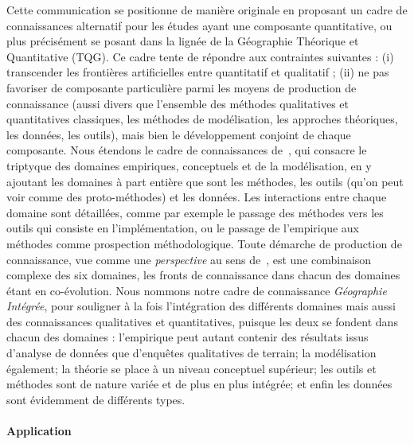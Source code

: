 \documentclass[11pt]{article}
\begin{document}
Cette communication se positionne de manière originale en proposant un cadre de connaissances alternatif pour les études ayant une composante quantitative, ou plus précisément se posant dans la lignée de la Géographie Théorique et Quantitative (TQG). Ce cadre tente de répondre aux contraintes suivantes : (i) transcender les frontières artificielles entre quantitatif et qualitatif ; (ii) ne pas favoriser de composante particulière parmi les moyens de production de connaissance (aussi divers que l'ensemble des méthodes qualitatives et quantitatives classiques, les méthodes de modélisation, les approches théoriques, les données, les outils), mais bien le développement conjoint de chaque composante. Nous étendons le cadre de connaissances de~\cite{livet2010ontology}, qui consacre le triptyque des domaines empiriques, conceptuels et de la modélisation, en y ajoutant les domaines à part entière que sont les méthodes, les outils (qu'on peut voir comme des proto-méthodes) et les données. Les interactions entre chaque domaine sont détaillées, comme par exemple le passage des méthodes vers les outils qui consiste en l'implémentation, ou le passage de l'empirique aux méthodes comme prospection méthodologique. Toute démarche de production de connaissance, vue comme une \emph{perspective} au sens de~\cite{giere2010scientific}, est une combinaison complexe des six domaines, les fronts de connaissance dans chacun des domaines étant en co-évolution. Nous nommons notre cadre de connaissance \emph{Géographie Intégrée}, pour souligner à la fois l'intégration des différents domaines mais aussi des connaissances qualitatives et quantitatives, puisque les deux se fondent dans chacun des domaines : l'empirique peut autant contenir des résultats issus d'analyse de données que d'enquêtes qualitatives de terrain; la modélisation également; la théorie se place à un niveau conceptuel supérieur; les outils et méthodes sont de nature variée et de plus en plus intégrée; et enfin les données sont évidemment de différents types.




\paragraph{Application}
\end{document}
